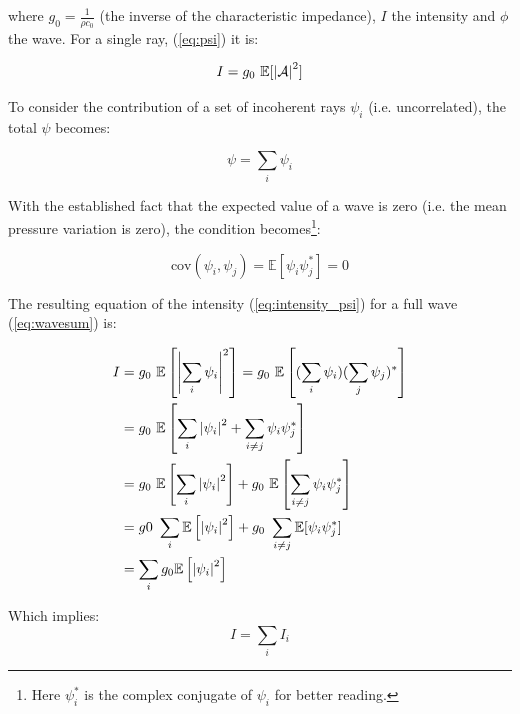 where $g_0 = \tfrac{1}{\rho c_0}$ (the inverse of the characteristic impedance),
$I$ the intensity and $\phi$ the wave.
For a single ray, (\ref{eq:psi}) it is:

\begin{equation*}
I = g_0~\mathbb{E}[\left|\mathcal{A}\right|^2]
\end{equation*}

To consider the contribution of a set of incoherent rays $\psi_i$ (i.e.
uncorrelated), the total $\psi$ becomes:

\begin{equation}\label{eq:wavesum}
\psi = \sum_i \psi_i 
\end{equation}

With the established fact that the expected value of a wave is zero (i.e. the
mean pressure variation is zero), the condition
becomes\footnote{Here $\psi_i^*$ is the complex conjugate of $\psi_i$ for
better reading.}:


\begin{equation}
\label{eq:wave_uncorr}
\text{cov}(\psi_i,\psi_j) = \mathbb{E}[\psi_i \psi_j^*] = 0
\end{equation}

The resulting equation of the intensity (\ref{eq:intensity_psi}) for a
full wave (\ref{eq:wavesum}) is:

\begin{equation*}
\begin{split}
I &= g_0~\mathbb{E}\left[\left| \sum_i \psi_i \right| ^2\right] =
g_0~\mathbb{E}\left[ (\sum_i \psi_i)(\sum_j \psi_j)^*\right] \\
&= g_0~\mathbb{E}\left[\sum_i \left|\psi_i\right|^2 + \sum_{i \neq j} \psi_i
\psi_j^*\right] \\
&= g_0~\mathbb{E}\left[\sum_i \left|\psi_i\right|^2\right]  +
g_0~\mathbb{E}\left[\sum_{i \neq j} \psi_i \psi_j^*\right] \\
& = g0~\sum_i \mathbb{E}\left[\left|\psi_i\right|^2\right]  + g_0~\sum_{i \neq j}
\mathbb{E}[\psi_i \psi_j^*] \\
& = \sum_i g_0\mathbb{E}\left[\left|\psi_i\right|^2\right]
\end{split}
\end{equation*}

Which implies:
\begin{equation}
\label{eq:intensity_sum}
I = \sum_i I_i
\end{equation}

